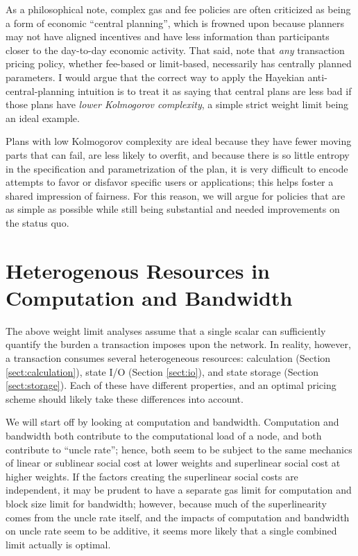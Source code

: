 \documentclass[12pt, final]{article}
\begin{document}
As a philosophical note, complex gas and fee policies are often criticized as being a form of economic ``central planning'', which is frowned upon because planners may not have aligned incentives and have less information than participants closer to the day-to-day economic activity. That said, note that \emph{any} transaction pricing policy, whether fee-based or limit-based, necessarily has centrally planned parameters. I would argue that the correct way to apply the Hayekian anti-central-planning intuition is to treat it as saying that central plans are less bad if those plans have \emph{lower Kolmogorov complexity}, a simple strict weight limit being an ideal example.

Plans with low Kolmogorov complexity are ideal because they have fewer moving parts that can fail, are less likely to overfit, and because there is so little entropy in the specification and parametrization of the plan, it is very difficult to encode attempts to favor or disfavor specific users or applications; this helps foster a shared impression of fairness. For this reason, we will argue for policies that are as simple as possible while still being substantial and needed improvements on the status quo.

\section{Heterogenous Resources in Computation and Bandwidth}

The above weight limit analyses assume that a single scalar can sufficiently quantify the burden a transaction imposes upon the network. In reality, however, a transaction consumes several heterogeneous resources: calculation (Section \ref{sect:calculation}), state I/O (Section \ref{sect:io}), and state storage (Section \ref{sect:storage}).  Each of these have different properties, and an optimal pricing scheme should likely take these differences into account.

We will start off by looking at computation and bandwidth. Computation and bandwidth both contribute to the computational load of a node, and both contribute to ``uncle rate''; hence, both seem to be subject to the same mechanics of linear or sublinear social cost at lower weights and superlinear social cost at higher weights. If the factors creating the superlinear social costs are independent, it may be prudent to have a separate gas limit for computation and block size limit for bandwidth; however, because much of the superlinearity comes from the uncle rate itself, and the impacts of computation and bandwidth on uncle rate seem to be additive, it seems more likely that a single combined limit actually is optimal.
\end{document}
